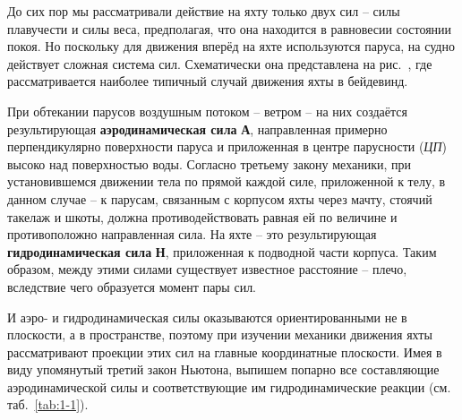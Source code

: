 До сих пор мы рассматривали действие на яхту только двух сил \--- силы
плавучести и силы веса,
предполагая, что она находится в равновесии состоянии покоя. Но
поскольку для движения вперёд на яхте используются паруса, на судно
действует сложная система сил. Схематически она представлена на
рис.~, где рассматривается наиболее типичный случай движения
яхты в бейдевинд.

При обтекании парусов воздушным потоком \--- ветром \--- на них
создаётся результирующая \textbf{аэродинамическая
  сила} \textbf{А}, направленная примерно
перпендикулярно поверхности паруса и приложенная в центре парусности
(\textit{ЦП}) высоко над поверхностью
воды. Согласно третьему закону механики, при установившемся движении
тела по прямой каждой силе, приложенной к телу, в данном случае \--- к
парусам, связанным с корпусом яхты через мачту, стоячий такелаж и
шкоты, должна противодействовать равная ей по величине и
противоположно направленная сила. На яхте \--- это результирующая
\textbf{гидродинамическая сила}
\textbf{Н}, приложенная к подводной части корпуса. Таким образом,
между этими силами существует известное расстояние \--- плечо,
вследствие чего образуется момент пары сил.

И аэро- и гидродинамическая силы оказываются ориентированными не в
плоскости, а в пространстве, поэтому при изучении механики движения
яхты рассматривают проекции этих сил на главные координатные
плоскости. Имея в виду упомянутый третий закон Ньютона, выпишем
попарно все составляющие аэродинамической силы и соответствующие им
гидродинамические реакции (см. таб.~\ref{tab:1-1}).

